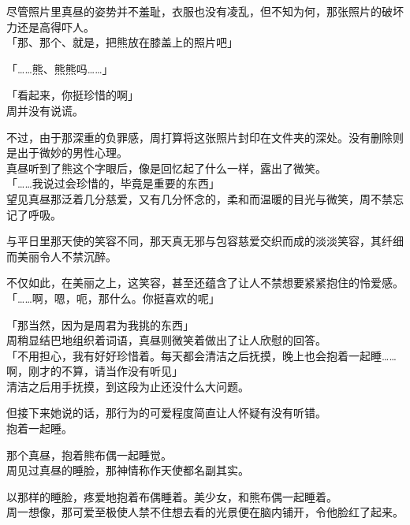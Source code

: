 尽管照片里真昼的姿势并不羞耻，衣服也没有凌乱，但不知为何，那张照片的破坏力还是高得吓人。\\

「那、那个、就是，把熊放在膝盖上的照片吧」

「……熊、熊熊吗……」

「看起来，你挺珍惜的啊」\\

周并没有说谎。

不过，由于那深重的负罪感，周打算将这张照片封印在文件夹的深处。没有删除则是出于微妙的男性心理。\\

真昼听到了熊这个字眼后，像是回忆起了什么一样，露出了微笑。\\

「……我说过会珍惜的，毕竟是重要的东西」\\

望见真昼那泛着几分慈爱，又有几分怀念的，柔和而温暖的目光与微笑，周不禁忘记了呼吸。

与平日里那天使的笑容不同，那天真无邪与包容慈爱交织而成的淡淡笑容，其纤细而美丽令人不禁沉醉。

不仅如此，在美丽之上，这笑容，甚至还蕴含了让人不禁想要紧紧抱住的怜爱感。\\

「……啊，嗯，呃，那什么。你挺喜欢的呢」

「那当然，因为是周君为我挑的东西」\\

周稍显结巴地组织着词语，真昼则微笑着做出了让人欣慰的回答。\\%

「不用担心，我有好好珍惜着。每天都会清洁之后抚摸，晚上也会抱着一起睡……啊，刚才的不算，请当作没有听见」\\

清洁之后用手抚摸，到这段为止还没什么大问题。

但接下来她说的话，那行为的可爱程度简直让人怀疑有没有听错。\\

抱着一起睡。

那个真昼，抱着熊布偶一起睡觉。\\

周见过真昼的睡脸，那神情称作天使都名副其实。

以那样的睡脸，疼爱地抱着布偶睡着。美少女，和熊布偶一起睡着。\\

周一想像，那可爱至极使人禁不住想去看的光景便在脑内铺开，令他脸红了起来。\\


